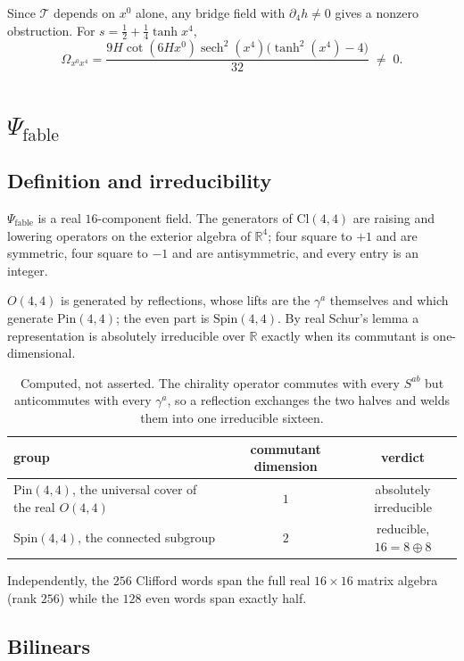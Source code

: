 \documentclass[11pt]{article}
\newcommand{\fableSpinor}{\ensuremath{\Psi_{\mathrm{fable}}}}
\newcommand{\Pin}{\mathrm{Pin}}
\newcommand{\Spin}{\mathrm{Spin}}
\begin{document}
Since $\mathcal T$ depends on $x^0$ alone, any bridge field with
$\partial_4h\neq0$ gives a nonzero obstruction. For $s=\tfrac12+\tfrac14\tanh x^4$,
\begin{equation}
  \Omega_{x^0x^4}
  = \frac{9H\cot(6Hx^0)\operatorname{sech}^2(x^4)\bigl(\tanh^2(x^4)-4\bigr)}{32}
  \;\neq\;0 .
\end{equation}

\section{\texorpdfstring{\fableSpinor}{fableSpinor}}

\subsection{Definition and irreducibility}

\fableSpinor{} is a real $16$-component field. The generators of
$\mathrm{Cl}(4,4)$ are raising and lowering operators on the exterior algebra of
$\mathbb{R}^4$; four square to $+1$ and are symmetric, four square to $-1$ and
are antisymmetric, and every entry is an integer.

$O(4,4)$ is generated by reflections, whose lifts are the $\gamma^a$ themselves
and which generate $\Pin(4,4)$; the even part is $\Spin(4,4)$. By real Schur's
lemma a representation is absolutely irreducible over $\mathbb{R}$ exactly when
its commutant is one-dimensional.

\begin{table}[htbp]
\centering
\small
\begin{tabular}{lcc}
\toprule
group & commutant dimension & verdict \\
\midrule
$\Pin(4,4)$, the universal cover of the real $O(4,4)$ & $1$ & absolutely irreducible \\
$\Spin(4,4)$, the connected subgroup & $2$ & reducible, $16=8\oplus8$ \\
\bottomrule
\end{tabular}
\caption{Computed, not asserted. The chirality operator commutes with every
$S^{ab}$ but anticommutes with every $\gamma^a$, so a reflection exchanges the
two halves and welds them into one irreducible sixteen.}
\end{table}

Independently, the $256$ Clifford words span the full real $16\times16$ matrix
algebra (rank $256$) while the $128$ even words span exactly half.

\subsection{Bilinears}
\end{document}
